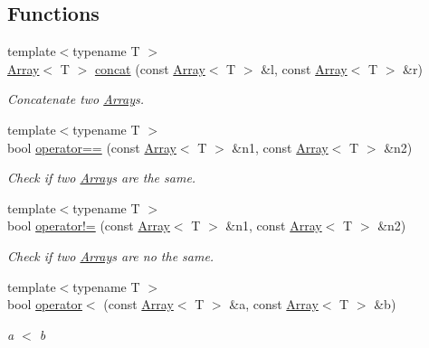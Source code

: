 \subsection*{Functions}
\begin{DoxyCompactItemize}
\item 
{\footnotesize template$<$typename T $>$ }\\\mbox{\hyperlink{classXMLArray_1_1Array}{Array}}$<$ T $>$ \mbox{\hyperlink{namespaceXMLArray_af16029dd462356447ca4c8264203335a}{concat}} (const \mbox{\hyperlink{classXMLArray_1_1Array}{Array}}$<$ T $>$ \&l, const \mbox{\hyperlink{classXMLArray_1_1Array}{Array}}$<$ T $>$ \&r)
\begin{DoxyCompactList}\small\item\em Concatenate two \mbox{\hyperlink{classXMLArray_1_1Array}{Array}}\textquotesingle{}s. \end{DoxyCompactList}\item 
{\footnotesize template$<$typename T $>$ }\\bool \mbox{\hyperlink{namespaceXMLArray_a832b56f8c7a9d6415cadd0d6e60635f1}{operator==}} (const \mbox{\hyperlink{classXMLArray_1_1Array}{Array}}$<$ T $>$ \&n1, const \mbox{\hyperlink{classXMLArray_1_1Array}{Array}}$<$ T $>$ \&n2)
\begin{DoxyCompactList}\small\item\em Check if two \mbox{\hyperlink{classXMLArray_1_1Array}{Array}}\textquotesingle{}s are the same. \end{DoxyCompactList}\item 
{\footnotesize template$<$typename T $>$ }\\bool \mbox{\hyperlink{namespaceXMLArray_a1cfa3f5a98b382e585af567e51479053}{operator!=}} (const \mbox{\hyperlink{classXMLArray_1_1Array}{Array}}$<$ T $>$ \&n1, const \mbox{\hyperlink{classXMLArray_1_1Array}{Array}}$<$ T $>$ \&n2)
\begin{DoxyCompactList}\small\item\em Check if two \mbox{\hyperlink{classXMLArray_1_1Array}{Array}}\textquotesingle{}s are no the same. \end{DoxyCompactList}\item 
{\footnotesize template$<$typename T $>$ }\\bool \mbox{\hyperlink{namespaceXMLArray_a6cdc9d50a3fbbd96cfbbef4bbaf78fa4}{operator$<$}} (const \mbox{\hyperlink{classXMLArray_1_1Array}{Array}}$<$ T $>$ \&a, const \mbox{\hyperlink{classXMLArray_1_1Array}{Array}}$<$ T $>$ \&b)
\begin{DoxyCompactList}\small\item\em a $<$ b \end{DoxyCompactList}\item 

\end{DoxyCompactItemize}
